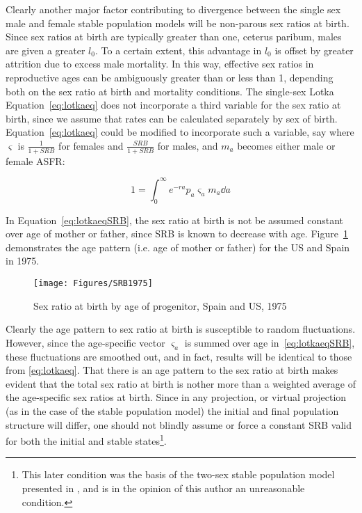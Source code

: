 Clearly another major factor contributing to divergence between the single sex
male and female stable population models will be non-parous sex ratios at birth.
Since sex ratios at birth are typically greater than one, ceterus paribum, males
are given a greater $l_0$. To a certain extent, this advantage in $l_0$ is
offset by greater attrition due to excess male mortality. In this way, effective
sex ratios in reproductive ages can be ambiguously greater than or less than 1,
depending both on the sex ratio at birth and mortality conditions. The
single-sex Lotka Equation~\eqref{eq:lotkaeq} does not incorporate a third
variable for the sex ratio at birth, since we assume that rates can be
calculated separately by sex of birth. Equation~\eqref{eq:lotkaeq} could be
modified to incorporate such a variable, say where $\varsigma$ is
$\tfrac{1}{1+SRB}$ for females and $\tfrac{SRB}{1+SRB}$ for males, and $m_a$
becomes either male or female ASFR:

\begin{equation}
\label{eq:lotkaeqSRB}
1 = \int _0 ^\infty e^{-ra}p_a \varsigma_a m_a \dd a 
\end{equation}

In Equation~\eqref{eq:lotkaeqSRB}, the sex ratio at birth is not be assumed
constant over age of mother or father, since SRB is known to decrease with age.
Figure~\ref{fig:SRB1975} demonstrates the age pattern (i.e. age of mother or
father) for the US and Spain in 1975.

\begin{figure}[ht!]
        \centering  
          \caption{Sex ratio at birth by age of progenitor, Spain
          and US, 1975}
           \texttt{[image: Figures/SRB1975]}
          \label{fig:SRB1975}
\end{figure}

Clearly the age pattern to sex ratio at birth is susceptible to random
fluctuations. However, since the age-specific vector $\varsigma _a$ is summed
over age in~\eqref{eq:lotkaeqSRB}, these fluctuations are smoothed out, and in
fact, results will be identical to those from \eqref{eq:lotkaeq}. That there is
an age pattern to the sex ratio at birth makes evident that the total sex ratio 
at birth is nother more than a weighted
average of the age-specific sex ratios at birth. Since in any projection, or
virtual projection (as in the case of the stable population model) the initial
and final population structure will differ, one should not blindly assume or
force a constant SRB valid for both the initial and stable states\footnote{This
later condition was the basis of the two-sex stable population model presented in
\citet{mitra1982alternative,mitra1978derivation,mitra1976effect}, and is in the
opinion of this author an unreasonable condition.}.

